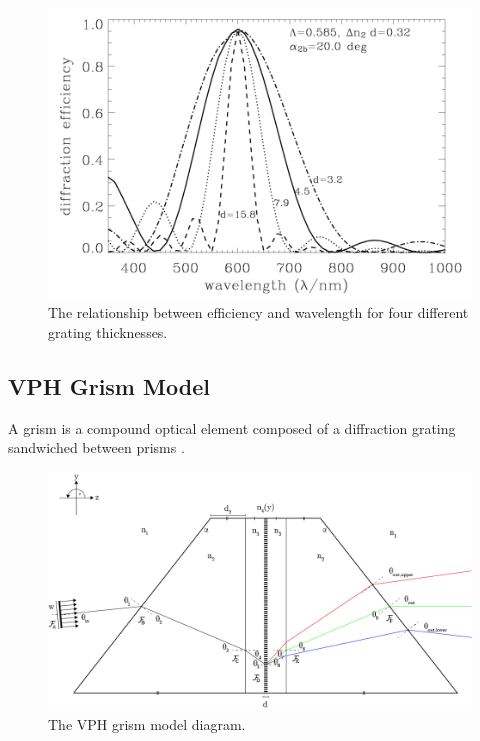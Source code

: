 \begin{figure}[H]
\centering
\includegraphics[width=\textwidth]{figures/efficiency-and-wavelength.png}
\caption{The relationship between efficiency and wavelength for four different grating thicknesses.}
\label{fig:efficiency-and-wavelength}
\end{figure}

\subsection{VPH Grism Model} 

A grism is a compound optical element composed of a diffraction grating sandwiched between prisms \cite{noauthor_2019-yh}.

\begin{figure}[H]
\centering
\includegraphics[width=\textwidth]{figures/grism-model.png}
\caption{The VPH grism model diagram.}
\label{fig:grism-model}
\end{figure}

